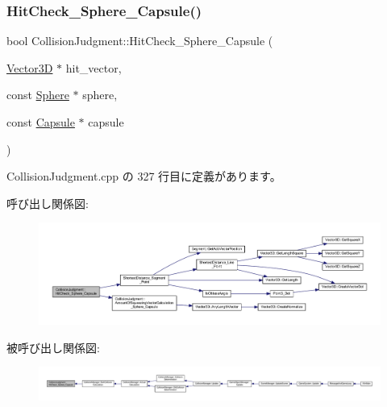 \subsubsection{\texorpdfstring{Hit\+Check\+\_\+\+Sphere\+\_\+\+Capsule()}{HitCheck\_Sphere\_Capsule()}}
{\footnotesize\ttfamily bool Collision\+Judgment\+::\+Hit\+Check\+\_\+\+Sphere\+\_\+\+Capsule (\begin{DoxyParamCaption}\item[{\mbox{\hyperlink{class_vector3_d}{Vector3D}} $\ast$}]{hit\+\_\+vector,  }\item[{const \mbox{\hyperlink{class_sphere}{Sphere}} $\ast$}]{sphere,  }\item[{const \mbox{\hyperlink{class_capsule}{Capsule}} $\ast$}]{capsule }\end{DoxyParamCaption})\hspace{0.3cm}{\ttfamily [static]}}



 Collision\+Judgment.\+cpp の 327 行目に定義があります。

呼び出し関係図\+:\nopagebreak
\begin{figure}[H]
\begin{center}
\leavevmode
\includegraphics[width=350pt]{class_collision_judgment_a4cc335999fcbeadf0aa1b6ebcb749e5b_cgraph}
\end{center}
\end{figure}
被呼び出し関係図\+:
\nopagebreak
\begin{figure}[H]
\begin{center}
\leavevmode
\includegraphics[width=350pt]{class_collision_judgment_a4cc335999fcbeadf0aa1b6ebcb749e5b_icgraph}
\end{center}
\end{figure}
\mbox{\label{class_collision_judgment_acd1d157a361d756632c73f4406442ce2}} 
